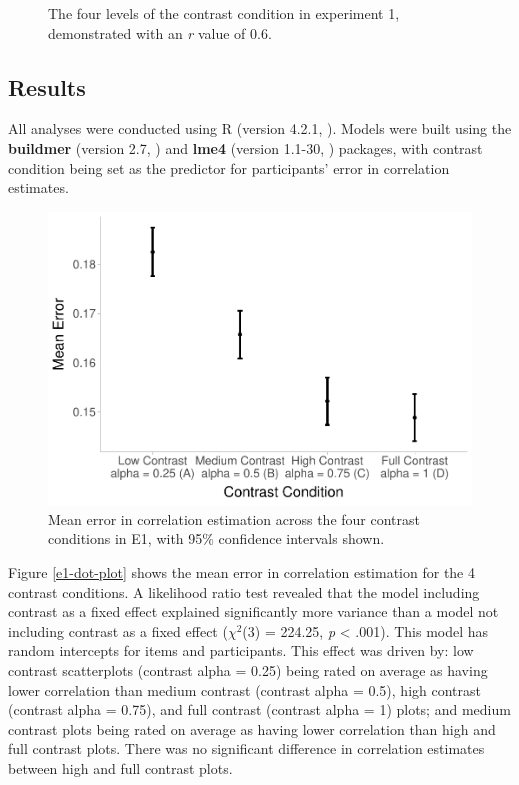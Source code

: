 \documentclass[preprint, 3p,
authoryear]{elsarticle} %
\begin{document}
\begin{figure}
\caption{\label{e1-example-plots}The four levels of the contrast condition in experiment 1, demonstrated with an \textit{r} value of 0.6.}\label{fig:e1-example-plots}
\end{figure}

\hypertarget{results}{%
\subsection{Results}\label{results}}

All analyses were conducted using R (version 4.2.1, \citealp{r_core}).
Models were built using the \textbf{buildmer} (version 2.7,
\citealp{voeten_buildmer_2022}) and \textbf{lme4} (version 1.1-30,
\citealp{bates_lme4_2015}) packages, with contrast condition being set
as the predictor for participants' error in correlation estimates.

\begin{figure}

\includegraphics[width=0.5\linewidth]{contrast_and_scatterplots_files/figure-latex/e1-dot-plot-1} \hfill{}

\caption{\label{e1-dot-plot}Mean error in correlation estimation across the four contrast conditions in E1, with 95\% confidence intervals shown.}\label{fig:e1-dot-plot}
\end{figure}

Figure \ref{e1-dot-plot} shows the mean error in correlation estimation
for the 4 contrast conditions. A likelihood ratio test revealed that the
model including contrast as a fixed effect explained significantly more
variance than a model not including contrast as a fixed effect
(\(\chi^2\)(3) = 224.25, \emph{p} \textless{} .001). This model has
random intercepts for items and participants. This effect was driven by:
low contrast scatterplots (contrast alpha = 0.25) being rated on average
as having lower correlation than medium contrast (contrast alpha = 0.5),
high contrast (contrast alpha = 0.75), and full contrast (contrast alpha
= 1) plots; and medium contrast plots being rated on average as having
lower correlation than high and full contrast plots. There was no
significant difference in correlation estimates between high and full
contrast plots.
\end{document}
